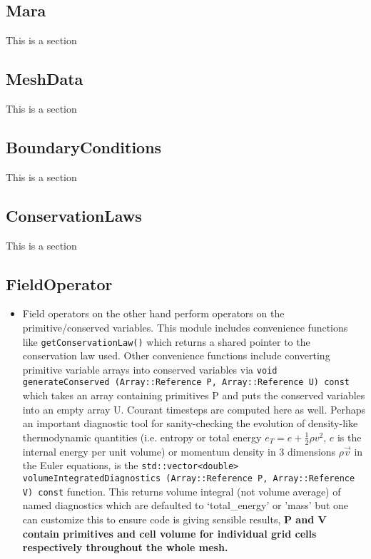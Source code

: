 \documentclass{article}
\begin{document}
\subsection{Mara}
This is a section 

\subsection{MeshData}
This is a section 

\subsection{BoundaryConditions}
This is a section 

\subsection{ConservationLaws}
This is a section 

\subsection{FieldOperator}
\begin{itemize}
	\item Field operators on the other hand perform operators on the primitive/conserved variables. This module includes convenience functions like \texttt{getConservationLaw()} which returns a shared pointer to the conservation law used. Other convenience functions include converting primitive variable arrays into conserved variables via \texttt{void generateConserved (Array::Reference P, Array::Reference U) const} which takes an array containing primitives P and puts the conserved variables into an empty array U. Courant timesteps are computed here as well. Perhaps an important diagnostic tool for sanity-checking the evolution of density-like thermodynamic quantities (i.e. entropy or total energy $e_T=e+\frac{1}{2}\rho v^2$, $e$ is the internal energy per unit volume) or momentum density in 3 dimensions $\rho \vec{v}$ in the Euler equations, is the \texttt{std::vector<double> volumeIntegratedDiagnostics (Array::Reference P, Array::Reference V) const} function. This returns volume integral (not volume average) of named diagnostics which are defaulted to `total\_energy' or 'mass' but one can customize this to ensure code is giving sensible results, \textbf{P and V contain primitives and cell volume for individual grid cells respectively throughout the whole mesh.} 
\end{itemize}
\end{document}
